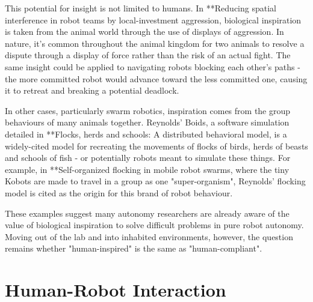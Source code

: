 \documentclass{sfuthesis}
\begin{document}
This potential for insight is not limited to humans. In **Reducing spatial interference in robot teams by local-investment aggression, biological inspiration is taken from the animal world through the use of displays of aggression. In nature, it's common throughout the animal kingdom for two animals to resolve a dispute through a display of force rather than the risk of an actual fight. The same insight could be applied to navigating robots blocking each other's paths - the more committed robot would advance toward the less committed one, causing it to retreat and breaking a potential deadlock. 

In other cases, particularly swarm robotics, inspiration comes from the group behaviours of many animals together. Reynolds' Boids, a software simulation detailed in **Flocks, herds and schools: A distributed behavioral model, is a widely-cited model for recreating the movements of flocks of birds, herds of beasts and schools of fish - or potentially robots meant to simulate these things. For example, in **Self-organized flocking in mobile robot swarms, where the tiny Kobots are made to travel in a group as one "super-organism", Reynolds' flocking model is cited as the origin for this brand of robot behaviour.

These examples suggest many autonomy researchers are already aware of the value of biological inspiration to solve difficult problems in pure robot autonomy. Moving out of the lab and into inhabited environments, however, the question remains whether "human-inspired" is the same as "human-compliant".



















\chapter{Human-Robot Interaction}
\end{document}
